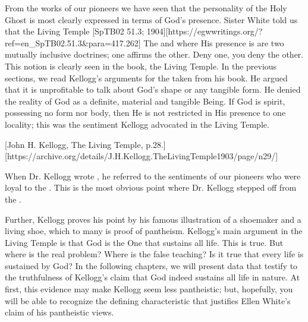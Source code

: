 From the works of our pioneers we have seen that the personality of the Holy Ghost is most clearly expressed in terms of God’s presence. Sister White told us that the Living Temple [SpTB02 51.3; 1904][https://egwwritings.org/?ref=en\_SpTB02.51.3&para=417.262] The  and where His presence is are two mutually inclusive doctrines; one affirms the other. Deny one, you deny the other. This notion is clearly seen in the book, the Living Temple. In the previous sections, we read Kellogg’s arguments for the  taken from his book. He argued that it is unprofitable to talk about God’s shape or any tangible form. He denied the reality of God as a definite, material and tangible Being. If God is spirit, possessing no form nor body, then He is not restricted in His presence to one locality; this was the sentiment Kellogg advocated in the Living Temple.

[John H. Kellogg, The Living Temple, p.28.][https://archive.org/details/J.H.Kellogg.TheLivingTemple1903/page/n29/]

When Dr. Kellogg wrote , he referred to the sentiments of our pioneers who were loyal to the . This is the most obvious point where Dr. Kellogg stepped off from the .

Further, Kellogg proves his point by his famous illustration of a shoemaker and a living shoe, which to many is proof of pantheism. Kellogg’s main argument in the Living Temple is that God is the One that sustains all life. This is true. But where is the real problem? Where is the false teaching? Is it true that every life is sustained by God? In the following chapters, we will present data that testify to the truthfulness of Kellogg’s claim that God indeed sustains all life in nature. At first, this evidence may make Kellogg seem less pantheistic; but, hopefully, you will be able to recognize the defining characteristic that justifies Ellen White’s claim of his pantheistic views. 
